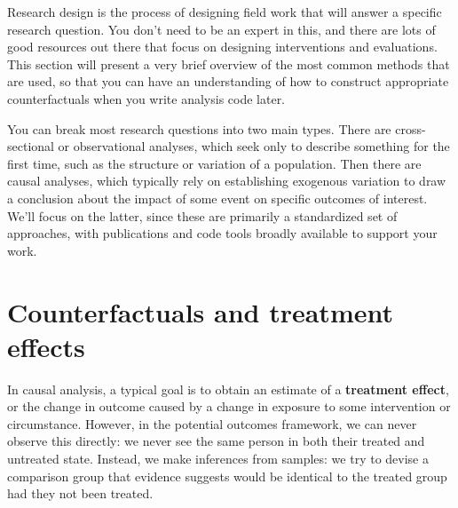 
\begin{fullwidth}
Research design is the process of designing field work
that will answer a specific research question.
You don't need to be an expert in this,
and there are lots of good resources out there
that focus on designing interventions and evaluations.
This section will present a very brief overview
of the most common methods that are used,
so that you can have an understanding of
how to construct appropriate counterfactuals
when you write analysis code later.

You can break most research questions into two main types.
There are cross-sectional or observational analyses,
which seek only to describe something for the first time,
such as the structure or variation of a population.
Then there are causal analyses,
which typically rely on establishing exogenous variation
to draw a conclusion about the impact of some event
on specific outcomes of interest.
We'll focus on the latter, since these are primarily
a standardized set of approaches, with publications
and code tools broadly available to support your work.
\end{fullwidth}


\section{Counterfactuals and treatment effects}

In causal analysis, a typical goal is to obtain an estimate
of a \textbf{treatment effect}, or the change in outcome
caused by a change in exposure to some intervention or circumstance.\cite{abadie2018econometric}
However, in the potential outcomes framework,
we can never observe this directly:
we never see the same person in both their treated and untreated state.
Instead, we make inferences from samples:
we try to devise a comparison group that evidence suggests
would be identical to the treated group had they not been treated.

